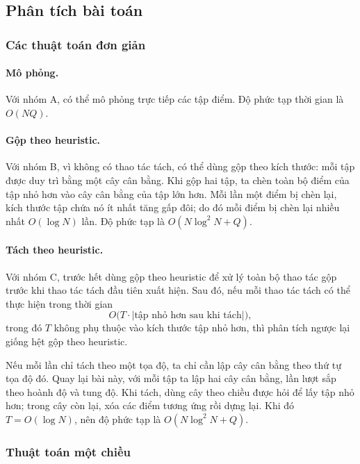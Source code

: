 \documentclass[11pt]{article}
\begin{document}
\subsection{Phân tích bài toán}

\subsubsection{Các thuật toán đơn giản}

\paragraph{Mô phỏng.}
Với nhóm A, có thể mô phỏng trực tiếp các tập điểm. Độ phức tạp thời gian là
\(O(NQ)\).

\paragraph{Gộp theo heuristic.}
Với nhóm B, vì không có thao tác tách, có thể dùng gộp theo kích thước: mỗi tập
được duy trì bằng một cây cân bằng. Khi gộp hai tập, ta chèn toàn bộ điểm của
tập nhỏ hơn vào cây cân bằng của tập lớn hơn. Mỗi lần một điểm bị chèn lại, kích
thước tập chứa nó ít nhất tăng gấp đôi; do đó mỗi điểm bị chèn lại nhiều nhất
\(O(\log N)\) lần. Độ phức tạp là \(O(N\log^2 N+Q)\).

\paragraph{Tách theo heuristic.}
Với nhóm C, trước hết dùng gộp theo heuristic để xử lý toàn bộ thao tác gộp
trước khi thao tác tách đầu tiên xuất hiện. Sau đó, nếu mỗi thao tác tách có thể
thực hiện trong thời gian
\[
  O\bigl(T\cdot \lvert\text{tập nhỏ hơn sau khi tách}\rvert\bigr),
\]
trong đó \(T\) không phụ thuộc vào kích thước tập nhỏ hơn, thì phân tích ngược
lại giống hệt gộp theo heuristic.

Nếu mỗi lần chỉ tách theo một tọa độ, ta chỉ cần lập cây cân bằng theo thứ tự
tọa độ đó. Quay lại bài này, với mỗi tập ta lập hai cây cân bằng, lần lượt sắp
theo hoành độ và tung độ. Khi tách, dùng cây theo chiều được hỏi để lấy tập nhỏ
hơn; trong cây còn lại, xóa các điểm tương ứng rồi dựng lại. Khi đó
\(T=O(\log N)\), nên độ phức tạp là \(O(N\log^2N+Q)\).

\subsubsection{Thuật toán một chiều}
\end{document}

